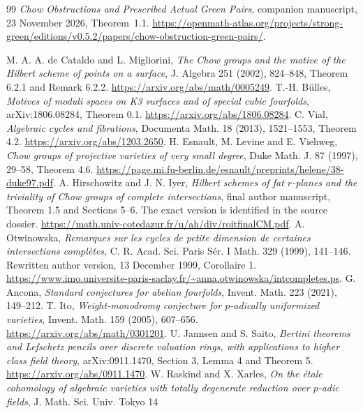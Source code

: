 \documentclass[11pt,a4paper]{article}
\theoremstyle{definition}
\theoremstyle{remark}\newtheorem{remark}[theorem]{Remark}
\numberwithin{equation}{section}
\begin{document}
\begin{thebibliography}{99}
 \emph{Chow Obstructions and Prescribed Actual Green Pairs}, companion manuscript, 23 November 2026, Theorem~1.1. \url{https://openmath-atlas.org/projects/strong-green/editions/v0.5.2/papers/chow-obstruction-green-pairs/}.

 M. A. A. de Cataldo and L. Migliorini,
\emph{The Chow groups and the motive of the Hilbert scheme of points
on a surface}, J. Algebra 251 (2002), 824--848, Theorem 6.2.1 and
Remark 6.2.2. \url{https://arxiv.org/abs/math/0005249}.
 T.-H. B\"ulles, \emph{Motives of moduli spaces on K3
surfaces and of special cubic fourfolds}, arXiv:1806.08284, Theorem 0.1.
\url{https://arxiv.org/abs/1806.08284}.
 C. Vial, \emph{Algebraic cycles and fibrations},
Documenta Math. 18 (2013), 1521--1553, Theorem 4.2.
\url{https://arxiv.org/abs/1203.2650}.
 H. Esnault, M. Levine and E. Viehweg,
\emph{Chow groups of projective varieties of very small degree},
Duke Math. J. 87 (1997), 29--58, Theorem 4.6.
\url{https://page.mi.fu-berlin.de/esnault/preprints/helene/38-duke97.pdf}.
 A. Hirschowitz and J. N. Iyer,
\emph{Hilbert schemes of fat $r$-planes and the triviality of Chow
groups of complete intersections}, final author manuscript,
Theorem 1.5 and Sections 5--6. The exact version is identified in
the source dossier.
\url{https://math.univ-cotedazur.fr/u/ah/div/roitfinalCM.pdf}.
 A. Otwinowska,
\emph{Remarques sur les cycles de petite dimension de certaines
intersections compl\`etes}, C. R. Acad. Sci. Paris S\'er. I Math.
329 (1999), 141--146. Rewritten author version, 13 December 1999,
Corollaire 1.
\url{https://www.imo.universite-paris-saclay.fr/~anna.otwinowska/intcompletes.ps}.
 G. Ancona, \emph{Standard conjectures for abelian
fourfolds}, Invent. Math. 223 (2021), 149--212.
 T. Ito, \emph{Weight-monodromy conjecture for
$p$-adically uniformized varieties}, Invent. Math. 159 (2005),
607--656. \url{https://arxiv.org/abs/math/0301201}.
 U. Jannsen and S. Saito,
\emph{Bertini theorems and Lefschetz pencils over discrete valuation
rings, with applications to higher class field theory},
arXiv:0911.1470, Section 3, Lemma 4 and Theorem 5.
\url{https://arxiv.org/abs/0911.1470}.
 W. Raskind and X. Xarles,
\emph{On the \'etale cohomology of algebraic varieties with totally degenerate
reduction over $p$-adic fields}, J. Math. Sci. Univ. Tokyo 14

\end{thebibliography}
\end{document}
